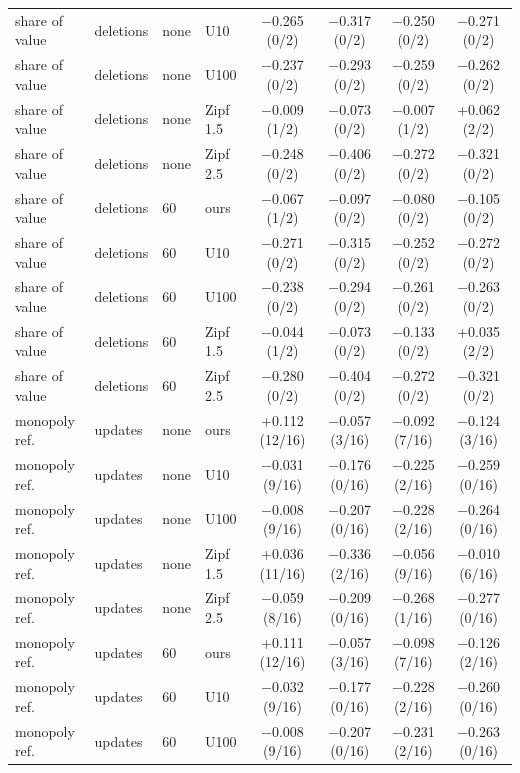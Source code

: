 \begin{table}[tp]
\begin{tabular}{@{}llllcccc@{}}
    share of value & deletions & none & U10 & $-$0.265 (0/2) & $-$0.317 (0/2) & $-$0.250 (0/2) & $-$0.271 (0/2) \\
    share of value & deletions & none & U100 & $-$0.237 (0/2) & $-$0.293 (0/2) & $-$0.259 (0/2) & $-$0.262 (0/2) \\
    share of value & deletions & none & Zipf 1.5 & $-$0.009 (1/2) & $-$0.073 (0/2) & $-$0.007 (1/2) & +0.062 (2/2) \\
    share of value & deletions & none & Zipf 2.5 & $-$0.248 (0/2) & $-$0.406 (0/2) & $-$0.272 (0/2) & $-$0.321 (0/2) \\
    \midrule
    share of value & deletions & 60 & ours & $-$0.067 (1/2) & $-$0.097 (0/2) & $-$0.080 (0/2) & $-$0.105 (0/2) \\
    share of value & deletions & 60 & U10 & $-$0.271 (0/2) & $-$0.315 (0/2) & $-$0.252 (0/2) & $-$0.272 (0/2) \\
    share of value & deletions & 60 & U100 & $-$0.238 (0/2) & $-$0.294 (0/2) & $-$0.261 (0/2) & $-$0.263 (0/2) \\
    share of value & deletions & 60 & Zipf 1.5 & $-$0.044 (1/2) & $-$0.073 (0/2) & $-$0.133 (0/2) & +0.035 (2/2) \\
    share of value & deletions & 60 & Zipf 2.5 & $-$0.280 (0/2) & $-$0.404 (0/2) & $-$0.272 (0/2) & $-$0.321 (0/2) \\
    \midrule
    monopoly ref. & updates & none & ours & +0.112 (12/16) & $-$0.057 (3/16) & $-$0.092 (7/16) & $-$0.124 (3/16) \\
    monopoly ref. & updates & none & U10 & $-$0.031 (9/16) & $-$0.176 (0/16) & $-$0.225 (2/16) & $-$0.259 (0/16) \\
    monopoly ref. & updates & none & U100 & $-$0.008 (9/16) & $-$0.207 (0/16) & $-$0.228 (2/16) & $-$0.264 (0/16) \\
    monopoly ref. & updates & none & Zipf 1.5 & +0.036 (11/16) & $-$0.336 (2/16) & $-$0.056 (9/16) & $-$0.010 (6/16) \\
    monopoly ref. & updates & none & Zipf 2.5 & $-$0.059 (8/16) & $-$0.209 (0/16) & $-$0.268 (1/16) & $-$0.277 (0/16) \\
    \midrule
    monopoly ref. & updates & 60 & ours & +0.111 (12/16) & $-$0.057 (3/16) & $-$0.098 (7/16) & $-$0.126 (2/16) \\
    monopoly ref. & updates & 60 & U10 & $-$0.032 (9/16) & $-$0.177 (0/16) & $-$0.228 (2/16) & $-$0.260 (0/16) \\
    monopoly ref. & updates & 60 & U100 & $-$0.008 (9/16) & $-$0.207 (0/16) & $-$0.231 (2/16) & $-$0.263 (0/16) \\

\end{tabular}
\end{table}
